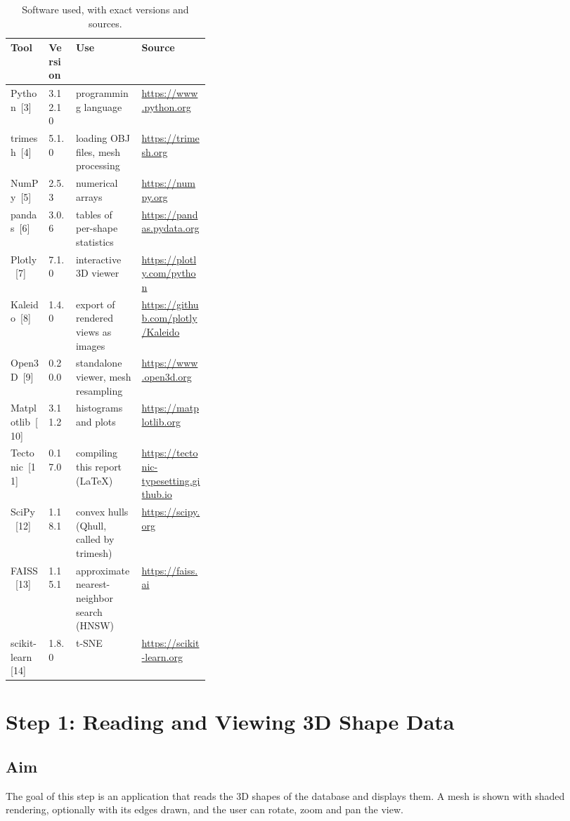 \documentclass[10pt,a4paper]{article}
\begin{document}
\begin{table}[htbp]\centering\small
\begin{tabular}{@{}llp{0.33\linewidth}l@{}}\toprule
Tool & Version & Use & Source\\\midrule
Python~[3]     & 3.12.10 & programming language & \url{https://www.python.org}\\
trimesh~[4]    & 5.1.0   & loading OBJ files, mesh processing & \url{https://trimesh.org}\\
NumPy~[5]      & 2.5.3   & numerical arrays & \url{https://numpy.org}\\
pandas~[6]     & 3.0.6   & tables of per-shape statistics & \url{https://pandas.pydata.org}\\
Plotly~[7]     & 7.1.0   & interactive 3D viewer & \url{https://plotly.com/python}\\
Kaleido~[8]    & 1.4.0   & export of rendered views as images & \url{https://github.com/plotly/Kaleido}\\
Open3D~[9]     & 0.20.0  & standalone viewer, mesh resampling & \url{https://www.open3d.org}\\
Matplotlib~[10] & 3.11.2 & histograms and plots & \url{https://matplotlib.org}\\
Tectonic~[11]  & 0.17.0  & compiling this report (LaTeX) & \url{https://tectonic-typesetting.github.io}\\
SciPy~[12]     & 1.18.1  & convex hulls (Qhull, called by trimesh) & \url{https://scipy.org}\\
FAISS~[13]     & 1.15.1  & approximate nearest-neighbor search (HNSW) & \url{https://faiss.ai}\\
scikit-learn~[14] & 1.8.0 & t-SNE & \url{https://scikit-learn.org}\\
\bottomrule\end{tabular}
\caption{Software used, with exact versions and sources.}\label{tab:tools}
\end{table}

\section{Step 1: Reading and Viewing 3D Shape Data}\label{sec:step1}

\subsection{Aim}
The goal of this step is an application that reads the 3D shapes of the database and displays them. A mesh is shown with shaded
rendering, optionally with its edges drawn, and the user can rotate, zoom and pan the view.
\end{document}
